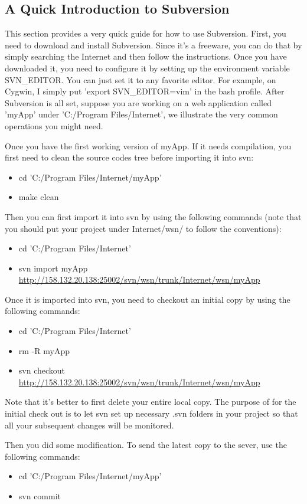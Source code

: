 \subsection{A Quick Introduction to Subversion}
\label{sec:svn}
This section provides a very quick guide for how to use Subversion. First, you need to download and install Subversion. Since it's a freeware, you can do that by simply searching the Internet and then follow the instructions. Once you have downloaded it,  you need to configure it by setting up the environment variable SVN\_EDITOR. You can just set it to any favorite editor. For example, on Cygwin, I simply put 'export SVN\_EDITOR=vim' in the bash profile. After Subversion is all set, suppose you are working on a web application called 'myApp' under 'C:/Program Files/Internet', we illustrate the very common operations you might need.

Once you have the first working version of myApp. If it needs compilation, you first need to clean the source codes tree before importing it into svn:
\begin{itemize}
\item cd 'C:/Program Files/Internet/myApp'
\item make clean
\end{itemize}

Then you can first import it into svn by using the following commands (note that you should put your project under Internet/wsn/ to follow the conventions):
\begin{itemize}
\item cd 'C:/Program Files/Internet'
\item svn import myApp \url{http://158.132.20.138:25002/svn/wsn/trunk/Internet/wsn/myApp}
\end{itemize}

Once it is imported into svn, you need to checkout an initial copy by using the following commands:
\begin{itemize}
\item cd 'C:/Program Files/Internet'
\item rm -R myApp
\item svn checkout \url{http://158.132.20.138:25002/svn/wsn/trunk/Internet/wsn/myApp}
\end{itemize}
Note that it's better to first delete your entire local copy. The purpose of for the initial check out is to let svn set up necessary .svn folders in your project so that all your subsequent changes will be monitored.

Then you did some modification. To send the latest copy to the sever, use the following commands:
\begin{itemize}
\item cd 'C:/Program Files/Internet/myApp'
\item svn commit
\end{itemize}

